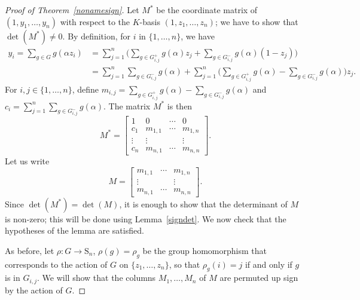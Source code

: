 \documentclass[12pt]{article}
\theoremstyle{plain}
\begin{document}
\begin{proof}[Proof of Theorem~\ref{nonamesign}]
  Let $M^*$ be the coordinate matrix of $(1, y_1, \ldots,
  y_n)$ with respect to the $K$-basis $(1, z_1, \ldots, z_n)$; 
  we  have to show that $\det (M^*) \neq 0$.
  By definition, for $i$ in $\{1,\dots,n\}$, we have
  \begin{align*}
y_i = \sum_{g \in G} g ({\alpha}z_i)&= \sum_{j=1}^n \Big(\sum_{g\in G^{+}_{i,j}}g(\alpha)z_j +\sum_{g\in G^{-}_{i,j}}g(\alpha)(1-z_j)\Big)\\
&=\sum_{j=1}^n\sum_{g\in G^{-}_{i,j}}g(\alpha)+ \sum_{j=1}^n\Big(\sum_{g\in G^{+}_{i,j}}g(\alpha) -\sum_{g\in G^{-}_{i,j}}g(\alpha)\Big)z_j.
  \end{align*}
For $i,j \in \lbrace1, \ldots , n \rbrace$, define $m_{i,j} =
\sum_{g\in G^{+}_{i,j}}g(\alpha) -\sum_{g\in G^{-}_{i,j}}g(\alpha)$
and $c_i = \sum_{j=1}^n\sum_{g\in G^{-}_{i,j}}g(\alpha)$. The matrix
$M^*$ is then
$$M^* = \begin{bmatrix}
1 & 0 & \cdots & 0\\
c_1 & m_{1,1} & \cdots & m_{1,n}\\
\vdots & \vdots &  & \vdots\\
c_{n} & m_{n,1} & \cdots	& m_{n,n}
\end{bmatrix}.
$$
Let us write
$$M = \begin{bmatrix}
 m_{1,1} & \cdots & m_{1,n}\\
 \vdots &  & \vdots\\
 m_{n,1} & \cdots	& m_{n,n}
\end{bmatrix}.$$
Since $\det(M^*) = \det (M)$, it is enough to show that the
determinant of $M$ is non-zero; this will be done using
Lemma~\ref{signdet}. We now check that the hypotheses of the lemma are
satisfied.

As before, let $\rho: G \to \mathrm{S}_n$, $\rho(g) =
\rho_g$ be the group homomorphism that corresponds to the action of
$G$ on $\lbrace z_1, \ldots , z_n \rbrace$, so that $\rho_g(i) = j$ if
and only if $g$ is in $G_{i,j}$. We will show that the columns
$M_1,\dots,M_n$ of $M$ are permuted up sign by the action of $G$.


\end{proof}
\end{document}
